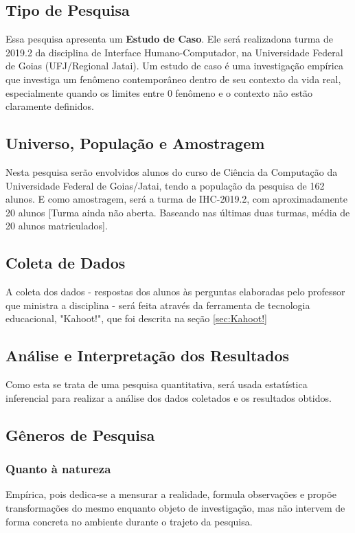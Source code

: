 \documentclass[
	12pt,				%
	openright,			%
	oneside,
	a4paper,			%
	english,			%
	french,				%
	spanish,			%
	brazil,				%
	]{abntex2}
\begin{document}
\subsection{Tipo de Pesquisa}
Essa pesquisa apresenta um \textbf{Estudo de Caso}. Ele será realizadona turma de 2019.2 da disciplina de Interface Humano-Computador, na Universidade Federal de Goias (UFJ/Regional Jatai). Um estudo de caso é uma investigação empírica que investiga um fenômeno contemporâneo dentro de seu contexto da vida real, especialmente quando os limites entre 0 fenômeno e o contexto não estão claramente definidos. \cite{yin2001planejamento}

\subsection{Universo, População e Amostragem}
Nesta pesquisa serão envolvidos alunos do curso de Ciência da Computação da Universidade Federal de Goias/Jatai, tendo a população da pesquisa de 162 alunos. E como amostragem, será a turma de IHC-2019.2, com aproximadamente 20 alunos {\color{red}[Turma ainda não aberta. Baseando nas últimas duas turmas, média de 20 alunos matriculados]}.

\subsection{Coleta de Dados}
A coleta dos dados - respostas dos alunos às perguntas elaboradas pelo professor que ministra a disciplina - será feita através da ferramenta de tecnologia educacional, "Kahoot!", que foi descrita na seção \ref{sec:Kahoot!}

\subsection{Análise e Interpretação dos Resultados}
Como esta se trata de uma pesquisa quantitativa, será usada estatística inferencial para realizar a análise dos dados coletados e os resultados obtidos.

\subsection{Gêneros de Pesquisa}
\subsubsection{Quanto à natureza}
Empírica, pois dedica-se a mensurar a realidade, formula observações e propõe transformações do mesmo enquanto objeto de investigação, mas não intervem de forma concreta no ambiente durante o trajeto da pesquisa.
\end{document}
